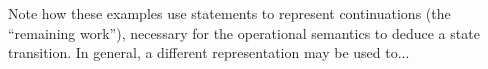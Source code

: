 \begin{description}
    Note how these examples use statements to represent continuations (the “remaining work”), necessary for the operational semantics to deduce a state transition.
    In general, a different representation may be used to...
    
    \begin{comment}
    In order to determine the next program state (or detect termination), a state must have a notion of “upcoming work”, usually represented by a statement internally.
    TODO: reasonable to call that “continuation”?
    
    Let $\setProgramState_s$ (with $s \in \setStmt$) be the set of program states having $s$ as upcoming work.
    This notion will be necessary to define soundness of \svl's static semantics.
    
    Examples:
    \begin{description}
        \item[Primitive]
        \begin{flalign*}
        	 & \setProgramState ~=~ \underbrace{(\setVar \rightharpoonup \mathbb{Z})}_{\textit{variable memory}} ~\times~ \setStmt & ~ \\
        	 & \setProgramState_s ~=~ (\setVar \rightharpoonup \mathbb{Z}) ~\times~ \setStmt_s                                     &
        \end{flalign*}
        
        \item[Stack]
        \begin{flalign*}
        	 & \setProgramState ~=~ \bigcup_{i \in \mathbb{N}_+}{\underbrace{\Big((\setVar \rightharpoonup \mathbb{Z}) ~\times~ \setStmt \Big)}_{\textit{stack frame}}}^i                                                                                \\
        	 & \setProgramState_s ~=~ \Big((\setVar \rightharpoonup \mathbb{Z}) ~\times~ \setStmt_s\Big) ~\times~ \underbrace{\bigcup_{i \in \mathbb{N}_0}{\Big((\setVar \rightharpoonup \mathbb{Z}) ~\times~ \setStmt \Big)^i}}_{\textit{lower frames}}
        \end{flalign*}
    \end{description}
     
    TODO: notion of initial state?
    \end{comment}
    

\end{description}
